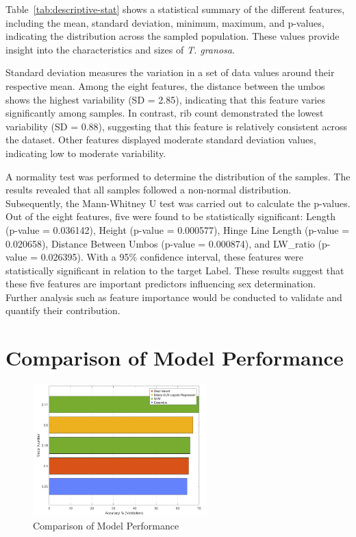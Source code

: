 Table~\ref{tab:descriptive-stat} shows a statistical summary of the different features, including the mean, standard deviation, minimum, maximum, and p-values, indicating the distribution across the sampled population. These values provide insight into the characteristics and sizes of \textit{T. granosa}. 

Standard deviation measures the variation in a set of data values around their respective mean. Among the eight features, the distance between the umbos shows the highest variability (SD = 2.85), indicating that this feature varies significantly among samples. In contrast, rib count demonstrated the lowest variability (SD = 0.88), suggesting that this feature is relatively consistent across the dataset. Other features displayed moderate standard deviation values, indicating low to moderate variability.

A normality test was performed to determine the distribution of the samples. The results revealed that all samples followed a non-normal distribution. Subsequently, the Mann-Whitney U test was carried out to calculate the p-values. Out of the eight features, five were found to be statistically significant: Length (p-value = 0.036142), Height (p-value = 0.000577), Hinge Line Length (p-value = 0.020658), Distance Between Umbos (p-value = 0.000874), and LW\_ratio (p-value = 0.026395). With a 95\% confidence interval, these features were statistically significant in relation to the target Label. These results suggest that these five features are important predictors influencing sex determination. Further analysis such as feature importance would be conducted to validate and quantify their contribution.  


\section{Comparison of Model Performance}
\begin{figure}[!htbp]
	\centering
	\includegraphics[width=0.6\textwidth]{figures/compare-models.png}
	\caption{Comparison of Model Performance}
	\label{fig:compare-models}
\end{figure}

